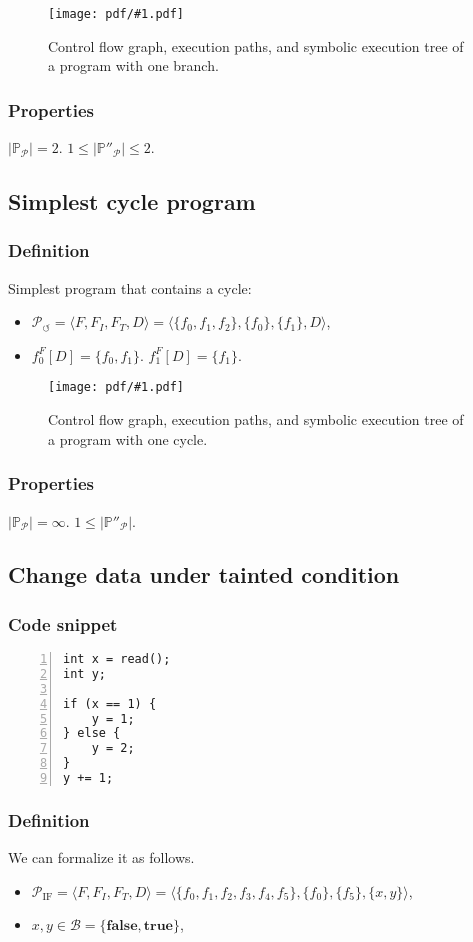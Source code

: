 \documentclass[oneside,a4paper]{article}  %
\newcommand{\sublevel}{\subsection}
\newcommand{\subsublevel}{\subsubsection}
\newcommand{\true}{\textbf{true}}
\newcommand{\false}{\textbf{false}}
\newcommand{\centerimage}[2]{
\begin{figure}[h!]
    \begin{center}
        \texttt{[image: pdf/\#1.pdf]}
        \caption{#2}
    \end{center}
    \label{img:#1}
\end{figure}
}
\begin{document}
\centerimage{execution_branch}
    {Control flow graph, execution paths,
        and symbolic execution tree of a program with one branch.}

\subsublevel*{Properties}

$|\mathds{P}_\mathcal{P}| = 2$.
$1 \le |\mathds{P}''_\mathcal{P}| \le 2$.

\sublevel{Simplest cycle program}

\subsublevel*{Definition}

Simplest program that contains a cycle:
\begin{itemize}
    \item $\mathcal{P}_{\circlearrowleft} = \langle F, F_I, F_T, D \rangle =
        \langle \{f_0, f_1, f_2\}, \{f_0\}, \{f_1\}, D \rangle$,
    \item $f_0^F[D] = \{f_0, f_1\}$. $f_1^F[D] = \{f_1\}$.
\end{itemize}

\centerimage{execution_cycle}
    {Control flow graph, execution paths,
        and symbolic execution tree of a program with one cycle.}

\subsublevel*{Properties}

$|\mathds{P}_\mathcal{P}| = \infty$.
$1 \le |\mathds{P}''_\mathcal{P}|$.

\sublevel{Change data under tainted condition}

\subsublevel*{Code snippet}

\begin{lstlisting}[numbers=left,numberstyle=\scriptsize]
int x = read();
int y;

if (x == 1) {
    y = 1;
} else {
    y = 2;
}
y += 1;
\end{lstlisting}

\subsublevel*{Definition}

We can formalize it as follows.
\begin{itemize}
    \item $\mathcal{P}_\text{IF} = \langle F, F_I, F_T, D \rangle =
    \langle \{f_0, f_1, f_2, f_3, f_4, f_5\},
        \{f_0\}, \{f_5\}, \{x, y\} \rangle$,
    \item $x, y \in \mathcal{B} = \{\false, \true\}$,
\end{itemize}
\end{document}
